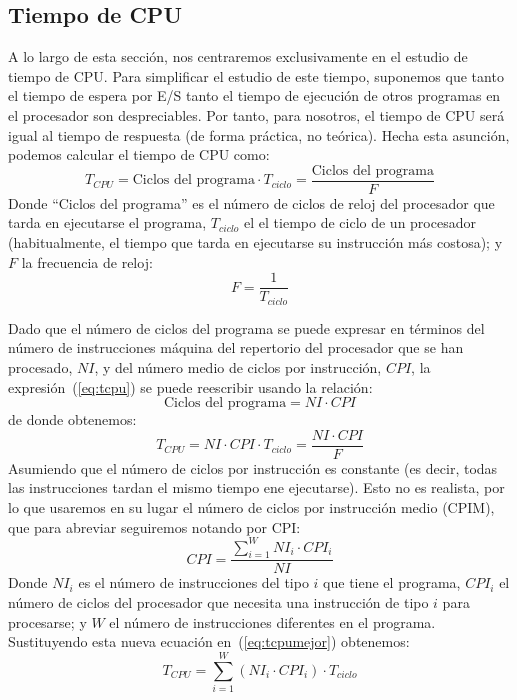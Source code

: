 \subsection{Tiempo de CPU}
A lo largo de esta sección, nos centraremos exclusivamente en el estudio de tiempo de CPU. Para simplificar el estudio de este tiempo, suponemos que tanto el tiempo de espera por E/S tanto el tiempo de ejecución de otros programas en el procesador son despreciables. Por tanto, para nosotros, el tiempo de CPU será igual al tiempo de respuesta (de forma práctica, no teórica). Hecha esta asunción, podemos calcular el tiempo de CPU como:
\begin{equation}
    T_{CPU} = \text{Ciclos del programa} \cdot T_{ciclo} = \dfrac{\text{Ciclos del programa}}{F}
    \label{eq:tcpu}
\end{equation}
Donde ``Ciclos del programa'' es el número de ciclos de reloj del procesador que tarda en ejecutarse el programa, $T_{ciclo}$ el el tiempo de ciclo de un procesador (habitualmente, el tiempo que tarda en ejecutarse su instrucción más costosa); y $F$ la frecuencia de reloj:
\begin{equation}
    F = \dfrac{1}{T_{ciclo}}
\end{equation}

Dado que el número de ciclos del programa se puede expresar en términos del número de instrucciones máquina del repertorio del procesador que se han procesado, $NI$, y del número medio de ciclos por instrucción, $CPI$, la expresión~(\ref{eq:tcpu}) se puede reescribir usando la relación:
\begin{equation}
    \text{Ciclos del programa} = NI\cdot CPI
\end{equation}
de donde obtenemos:
\begin{equation} \label{eq:tcpumejor}
    T_{CPU} = NI \cdot CPI \cdot T_{ciclo} = \dfrac{NI \cdot CPI}{F}
\end{equation}
Asumiendo que el número de ciclos por instrucción es constante (es decir, todas las instrucciones tardan el mismo tiempo ene ejecutarse). Esto no es realista, por lo que usaremos en su lugar el número de ciclos por instrucción medio (CPIM), que para abreviar seguiremos notando por CPI:
\begin{equation}
    CPI = \dfrac{\sum_{i=1}^W NI_i \cdot CPI_i}{NI}
\end{equation}
Donde $NI_i$ es el número de instrucciones del tipo $i$ que tiene el programa, $CPI_i$ el número de ciclos del procesador que necesita una instrucción de tipo $i$ para procesarse; y $W$ el número de instrucciones diferentes en el programa. Sustituyendo esta nueva ecuación en~(\ref{eq:tcpumejor}) obtenemos:
\begin{equation}
    T_{CPU} = \sum_{i=1}^W \left(NI_i \cdot CPI_i \right) \cdot T_{ciclo}
\end{equation}

